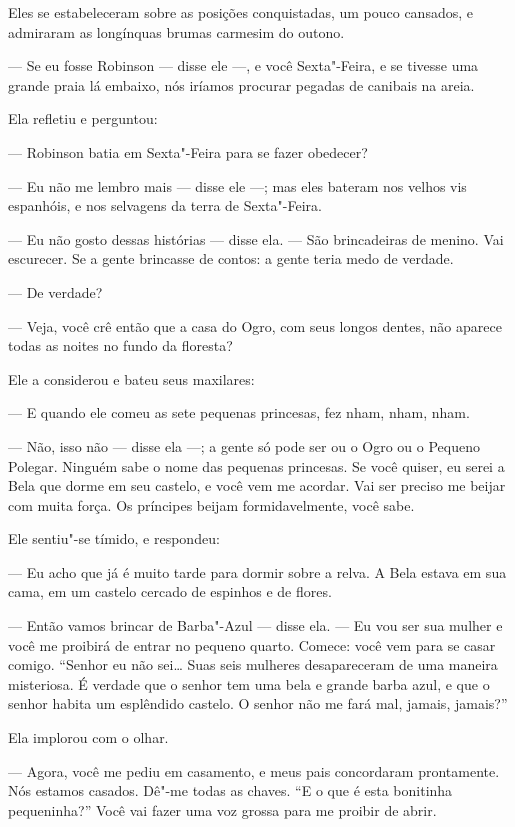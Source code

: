 Eles se estabeleceram sobre as posições conquistadas, um pouco
cansados, e admiraram as longínquas brumas carmesim do outono.

--- Se eu fosse Robinson --- disse ele ---, e você Sexta"-Feira, e se tivesse
uma grande praia lá embaixo, nós iríamos procurar pegadas de canibais na
areia.

Ela refletiu e perguntou:

--- Robinson batia em Sexta"-Feira para se fazer obedecer?

--- Eu não me lembro mais --- disse ele ---; mas eles bateram nos velhos vis
espanhóis, e nos selvagens da terra de Sexta"-Feira.

--- Eu não gosto dessas histórias --- disse ela. --- São brincadeiras de
menino. Vai escurecer. Se a gente brincasse de contos: a gente teria medo
de verdade.

--- De verdade?

--- Veja, você crê então que a casa do Ogro, com seus longos dentes, não
aparece todas as noites no fundo da floresta?

Ele a considerou e bateu seus maxilares:

--- E quando ele comeu as sete pequenas princesas, fez nham, nham, nham.

--- Não, isso não --- disse ela ---; a gente só pode ser ou o Ogro ou o Pequeno
Polegar. Ninguém sabe o nome das pequenas princesas. Se você quiser, eu
serei a Bela que dorme em seu castelo, e você vem me acordar. Vai ser
preciso me beijar com muita força. Os príncipes beijam formidavelmente,
você sabe.

Ele sentiu"-se tímido, e respondeu:

--- Eu acho que já é muito tarde para dormir sobre a relva. A Bela
estava em sua cama, em um castelo cercado de espinhos e de flores.

--- Então vamos brincar de Barba"-Azul --- disse ela. --- Eu vou ser sua mulher
e você me proibirá de entrar no pequeno quarto. Comece: você vem para se
casar comigo. “Senhor eu não sei\ldots{} Suas seis mulheres desapareceram de uma
maneira misteriosa. É verdade que o senhor tem uma bela e grande barba
azul, e que o senhor habita um esplêndido castelo. O senhor não me fará
mal, jamais, jamais?”

Ela implorou com o olhar.

--- Agora, você me pediu em casamento, e meus pais concordaram
prontamente. Nós estamos casados. Dê"-me todas as chaves. “E o que é esta
bonitinha pequeninha?” Você vai fazer uma voz grossa para me proibir de abrir.

